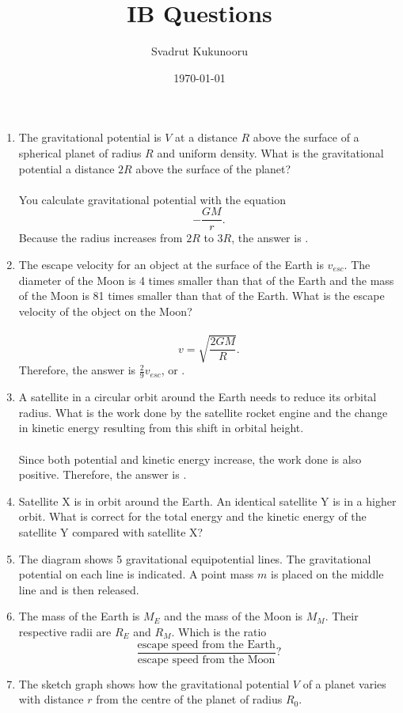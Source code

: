 \documentclass[a4paper]{article}
\title{IB Questions}
\author{Svadrut Kukunooru}
\date{\today}
\begin{document}
    \maketitle
    \begin{enumerate}
        \item The gravitational potential is $V$ at a distance $R$ above the surface of a spherical planet of radius $R$ and uniform density. What is the gravitational potential a distance $2R$ above the surface of the planet? \\ \\
        You calculate gravitational potential with the equation
            \[
            -\frac{GM}{r}
            .\] 
        Because the radius increases from $2R$ to $3R$, the answer is .
    \item The escape velocity for an object at the surface of the Earth is $v_{esc}$. The diameter of the Moon is 4 times smaller than that of the Earth and the mass of the Moon is 81 times smaller than that of the Earth. What is the escape velocity of the object on the Moon? \\ \\ 
        \[
        v = \sqrt{\frac{2GM}{R}} 
        .\] 
    Therefore, the answer is $\frac{2}{9}v_{esc}$, or . 
        \item A satellite in a circular orbit around the Earth needs to reduce its orbital radius. What is the work done by the satellite rocket engine and the change in kinetic energy resulting from this shift in orbital height. \\ \\ 
        Since both potential and kinetic energy increase, the work done is also positive. Therefore, the answer is . 
    \item Satellite X is in orbit around the Earth. An identical satellite Y is in a higher orbit. What is correct for the total energy and the kinetic energy of the satellite Y compared with satellite X? 
    \item The diagram shows 5 gravitational equipotential lines. The gravitational potential on each line is indicated. A point mass $m$ is placed on the middle line and is then released. 
    \item The mass of the Earth is $M_E$ and the mass of the Moon is $M_M$. Their respective radii are $R_E$ and $R_M$. Which is the ratio \[
            \frac{\text{escape speed from the Earth}}{\text{escape speed from the Moon}}
    ?\]
\item The sketch graph shows how the gravitational potential $V$ of a planet varies with distance $r$ from the centre of the planet of radius $R_0$. 
    \end{enumerate} 
\end{document}
